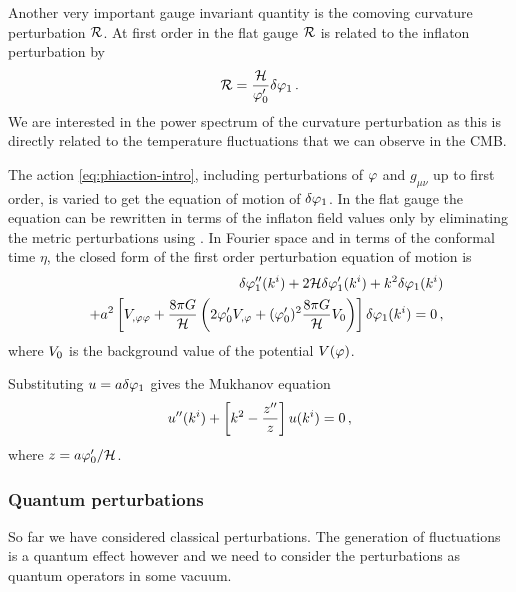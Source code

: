 Another very important gauge invariant quantity is the comoving curvature
perturbation $\mathcal{R}$. At first order in the flat gauge $\mathcal{R}$ is related to the
inflaton perturbation by \cite{Malik:2008im}
% 
\begin{equation}
\label{eq:flatRdefn-intro}
 \mathcal{R} = \frac{\mathcal{H}}{\varphi_0'}\delta\varphi_{1}\,.
\end{equation}
% 
We are interested in the power spectrum of the curvature perturbation as this
is directly related to the temperature fluctuations that we can observe in the
CMB. 

The action \eqref{eq:phiaction-intro},
including perturbations of $\varphi$ and $g_{\mu\nu}$ up to first order, is
varied to get the equation of motion of $\delta\varphi_{1}$. 
In the flat gauge the equation can be rewritten in terms of the inflaton field
values only by eliminating the metric perturbations using
. 
% 
In Fourier space and in terms of the conformal time $\eta$, the closed form of
the first order perturbation equation of motion is \cite{Malik:2008im}
% 
\begin{eqnarray}
\label{eq:fokg-intro}
&& \delta\varphi_{1}''(k^i) + 2\mathcal{H} \delta\varphi_{1}'(k^i) + k^2\delta\varphi_{1}(k^i) \nonumber\\
&&+ a^2 \left[V_{,\varphi\varphi} +
\frac{8\pi G}{\mathcal{H}}\left(2\varphi_{0}' V_{,\varphi} + (\varphi_{0}')^2\frac{8\pi G
}{\mathcal{H}}V_{0}\right)\right]\delta\varphi_{1}(k^i) = 0 \,,
\end{eqnarray}
% 
where $V_{0}$ is the background value of the potential $V(\varphi)$.
%


Substituting $u=a\delta\varphi_{1}$ gives the Mukhanov equation \cite{Mukhanov:1990me}
% 
\begin{equation}
 \label{eq:ueq-intro}
 u''(k^i) + \left[ k^2 -\frac{z''}{z}\right]u(k^i) = 0\,,
\end{equation}
% 
where $z= a\varphi_0'/\mathcal{H}$.

\subsubsection{Quantum perturbations}
So far we have considered classical perturbations. The generation of
fluctuations is a quantum effect however and we need to consider the
perturbations as quantum operators in some vacuum. 

